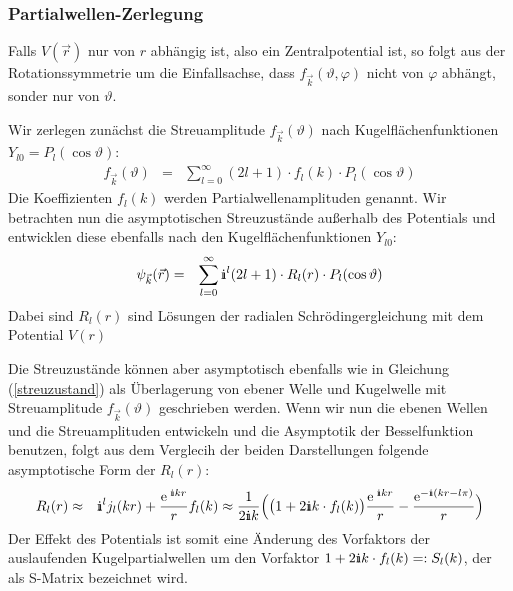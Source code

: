 \subsubsection{Partialwellen-Zerlegung}
Falls $V(\vec{r})$ nur von $r$ abhängig ist, also ein Zentralpotential ist, so folgt aus der Rotationssymmetrie um die Einfallsachse, dass $f_{\vec{k}}(\vartheta,\varphi)$ nicht von $\varphi$ abhängt, sonder nur von $\vartheta$. 

Wir zerlegen zunächst die Streuamplitude $f_{\vec k}(\vartheta)$ nach Kugelflächenfunktionen $Y_{l0}=P_l(\cos\vartheta)$: 
\begin{eqnarray*}
	f_{\vec{k}}(\vartheta) &=& \sum_{l=0}^{\infty} (2l + 1)\cdot f_l(k)\cdot P_l(\cos{\vartheta})
\end{eqnarray*}
Die Koeffizienten $f_l(k)$ werden Partialwellenamplituden genannt. Wir betrachten nun die asymptotischen Streuzustände außerhalb des Potentials und entwicklen diese ebenfalls nach den Kugelflächenfunktionen $Y_{l0}$: 
\begin{eqnarray*}
	\psi_{\vec k}(\vec r) &=& \sum_{l=0}^{\infty} \I^l (2l + 1)\cdot R_l(r)\cdot P_l(\cos{\vartheta})
\end{eqnarray*}
Dabei sind $R_l(r)$ sind Lösungen der radialen Schrödingergleichung mit dem Potential $V(r)$ 

Die Streuzustände können aber asymptotisch ebenfalls wie in Gleichung (\ref{streuzustand}) als Überlagerung von ebener Welle und Kugelwelle mit Streuamplitude $f_{\vec{k}}(\vartheta)$ geschrieben werden. Wenn wir nun die ebenen Wellen und die Streuamplituden entwickeln und die Asymptotik der Besselfunktion benutzen, folgt aus dem Verglecih der beiden Darstellungen folgende asymptotische Form der $R_l(r)$: 
\begin{eqnarray*}
	R_l(r) &\approx& \I^lj_l(kr) + \frac{\e^{\;\I kr}}{r} f_l(k) \approx \frac 1 {2\I k} \Big( \big( 1 + 2\I k\cdot f_l(k) \big)\frac{\e^{\;\I kr}}r - \frac{\e^{-\I(kr-l\pi)}}r\Big)
\end{eqnarray*}
Der Effekt des Potentials ist somit eine Änderung des Vorfaktors der auslaufenden Kugelpartialwellen um den Vorfaktor $1+2\I k\cdot f_l(k) =: S_l(k)$, der als S-Matrix bezeichnet wird.

